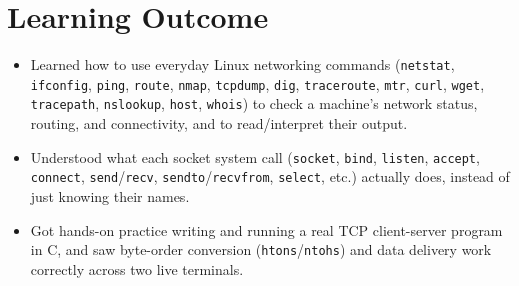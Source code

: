 \documentclass[11pt,a4paper]{article}
\begin{document}
\section{Learning Outcome}
\begin{itemize}
\item Learned how to use everyday Linux networking commands (\texttt{netstat},
\texttt{ifconfig}, \texttt{ping}, \texttt{route}, \texttt{nmap}, \texttt{tcpdump},
\texttt{dig}, \texttt{traceroute}, \texttt{mtr}, \texttt{curl}, \texttt{wget},
\texttt{tracepath}, \texttt{nslookup}, \texttt{host}, \texttt{whois}) to check a machine's
network status, routing, and connectivity, and to read/interpret their output.
\item Understood what each socket system call (\texttt{socket}, \texttt{bind},
\texttt{listen}, \texttt{accept}, \texttt{connect}, \texttt{send}/\texttt{recv},
\texttt{sendto}/\texttt{recvfrom}, \texttt{select}, etc.) actually does, instead of just
knowing their names.
\item Got hands-on practice writing and running a real TCP client-server program in C, and
saw byte-order conversion (\texttt{htons}/\texttt{ntohs}) and data delivery work correctly
across two live terminals.
\end{itemize}
\end{document}
